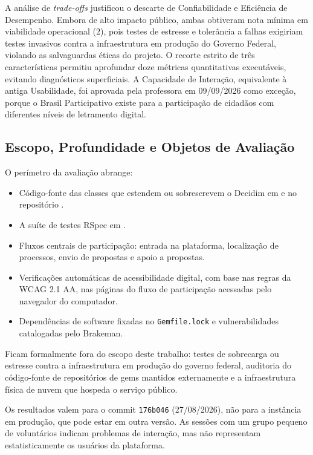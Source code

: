 \documentclass[journal]{IEEEtran}
\begin{document}
A análise de \textit{trade-offs} justificou o descarte de Confiabilidade e Eficiência de Desempenho. Embora de alto impacto público, ambas obtiveram nota mínima em viabilidade operacional ($2$), pois testes de estresse e tolerância a falhas exigiriam testes invasivos contra a infraestrutura em produção do Governo Federal, violando as salvaguardas éticas do projeto. O recorte estrito de três características permitiu aprofundar doze métricas quantitativas executáveis, evitando diagnósticos superficiais. A Capacidade de Interação, equivalente à antiga Usabilidade, foi aprovada pela professora em 09/09/2026 como exceção, porque o Brasil Participativo existe para a participação de cidadãos com diferentes níveis de letramento digital.

\subsection{Escopo, Profundidade e Objetos de Avaliação}
\label{sec:escopo}

O perímetro da avaliação abrange:
\begin{itemize}
    \item Código-fonte das classes que estendem ou sobrescrevem o Decidim em  e  no repositório .
    \item A suíte de testes RSpec em .
    \item Fluxos centrais de participação: entrada na plataforma, localização de processos, envio de propostas e apoio a propostas.
    \item Verificações automáticas de acessibilidade digital, com base nas regras da WCAG 2.1 AA, nas páginas do fluxo de participação acessadas pelo navegador do computador.
    \item Dependências de software fixadas no \texttt{Gemfile.lock} e vulnerabilidades catalogadas pelo Brakeman.
\end{itemize}

Ficam formalmente fora do escopo deste trabalho: testes de sobrecarga ou estresse contra a infraestrutura em produção do governo federal, auditoria do código-fonte de repositórios de gems mantidos externamente e a infraestrutura física de nuvem que hospeda o serviço público.

Os resultados valem para o commit \texttt{176b046} (27/08/2026), não para a instância em produção, que pode estar em outra versão. As sessões com um grupo pequeno de voluntários indicam problemas de interação, mas não representam estatisticamente os usuários da plataforma.
\end{document}
